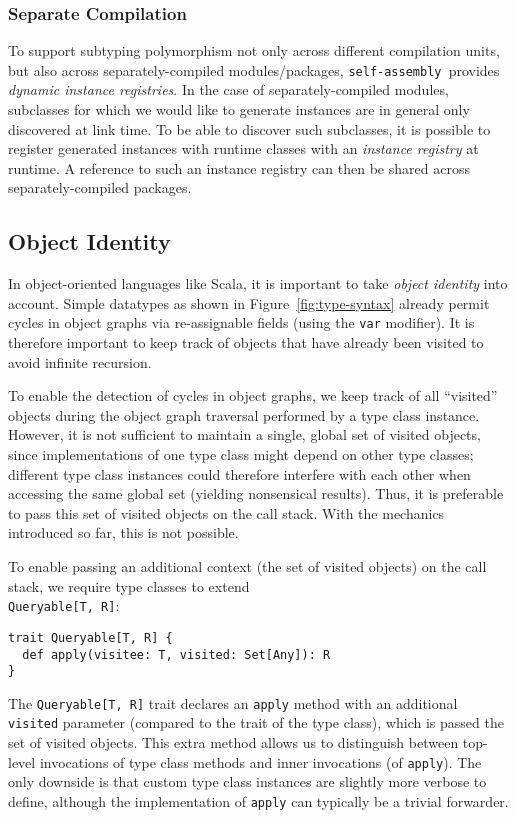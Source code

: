 \documentclass[preprint]{sigplanconf}
\newcommand{\selfassembly}{\texttt{self-assembly~}}
\begin{document}
\subsubsection{Separate Compilation}

To support subtyping polymorphism not only across different compilation units,
but also across separately-compiled modules/packages, \selfassembly provides
\emph{dynamic instance registries}. In the case of separately-compiled
modules, subclasses for which we would like to generate instances are in
general only discovered at link time. To be able to discover such subclasses,
it is possible to register generated instances with runtime classes with an
\emph{instance registry} at runtime. A reference to such an instance registry
can then be shared across separately-compiled packages.


\subsection{Object Identity}

In object-oriented languages like Scala, it is important to take \emph{object
identity} into account. Simple datatypes as shown in
Figure~\ref{fig:type-syntax} already permit cycles in object graphs via re-assignable
fields (using the \verb|var| modifier). It is therefore important to keep
track of objects that have already been visited to avoid infinite recursion.

To enable the detection of cycles in object graphs, we keep track of all
``visited'' objects during the object graph traversal performed by a type
class instance. However, it is not sufficient to maintain a single, global set
of visited objects, since implementations of one type class might depend on
other type classes; different type class instances could therefore interfere
with each other when accessing the same global set (yielding nonsensical
results). Thus, it is preferable to pass this set of visited objects on the
call stack. With the mechanics introduced so far, this is not possible.

To enable passing an additional context (the set of visited objects) on the call stack,
we require type classes to extend \\\verb|Queryable[T, R]|:

\begin{lstlisting}
trait Queryable[T, R] {
  def apply(visitee: T, visited: Set[Any]): R
}
\end{lstlisting}
\noindent
The \verb|Queryable[T, R]| trait declares an \verb|apply| method with an
additional \verb|visited| parameter (compared to the trait of the type class),
which is passed the set of visited objects. This extra method allows us to
distinguish between top-level invocations of type class methods and inner
invocations (of \verb|apply|). The only downside is that custom type class
instances are slightly more verbose to define, although the implementation of
\verb|apply| can typically be a trivial forwarder.
\end{document}
